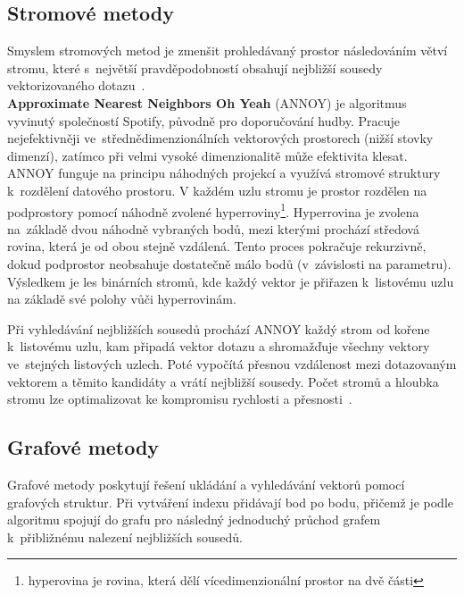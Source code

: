 \subsection{Stromové metody}
Smyslem stromových metod je zmenšit prohledávaný prostor následováním větví stromu, které s~největší pravděpodobností obsahují nejbližší sousedy vektorizovaného dotazu~\cite{han2023_vector_database}. \\

\textbf{Approximate Nearest Neighbors Oh Yeah} (ANNOY) je algoritmus vyvinutý společností Spotify, původně pro doporučování hudby. Pracuje nejefektivněji ve~střednědimenzionálních vektorových prostorech (nižší stovky dimenzí), zatímco při velmi vysoké dimenzionalitě může efektivita klesat. ANNOY funguje na principu náhodných projekcí a využívá stromové struktury k~rozdělení datového prostoru. V každém uzlu stromu je prostor rozdělen na podprostory pomocí náhodně zvolené hyperroviny\footnote{hyperovina je rovina, která dělí vícedimenzionální prostor na dvě části}. Hyperrovina je zvolena na~základě dvou náhodně vybraných bodů, mezi kterými prochází středová rovina, která je od obou stejně vzdálená. Tento proces pokračuje rekurzivně, dokud podprostor neobsahuje dostatečně málo bodů (v~závislosti na parametru). Výsledkem je les binárních stromů, kde každý vektor je přiřazen k~listovému uzlu na základě své polohy vůči hyperrovinám.

Při vyhledávání nejbližších sousedů prochází ANNOY každý strom od kořene k~listovému uzlu, kam připadá vektor dotazu a shromažďuje všechny vektory ve~stejných listových uzlech. Poté vypočítá přesnou vzdálenost mezi dotazovaným vektorem a těmito kandidáty a vrátí nejbližší sousedy. Počet stromů a hloubka stromu lze optimalizovat ke kompromisu rychlosti a přesnosti~\cite{bernardsson2015_annoy, han2023_vector_database}.


\subsection{Grafové metody}
\label{grafove metody}
Grafové metody poskytují řešení ukládání a vyhledávání vektorů pomocí grafových struktur. Při vytváření indexu přidávají bod po bodu, přičemž je podle algoritmu spojují do grafu pro následný jednoduchý průchod grafem k~přibližnému nalezení nejbližších sousedů. \\


